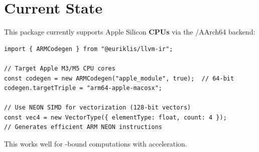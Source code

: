 \section{Current State}

This package currently supports Apple Silicon \textbf{CPUs} via the /AArch64 backend:

\begin{lstlisting}[style=ts]
import { ARMCodegen } from "@euriklis/llvm-ir";

// Target Apple M3/M5 CPU cores
const codegen = new ARMCodegen("apple_module", true);  // 64-bit
codegen.targetTriple = "arm64-apple-macosx";

// Use NEON SIMD for vectorization (128-bit vectors)
const vec4 = new VectorType({ elementType: float, count: 4 });
// Generates efficient ARM NEON instructions
\end{lstlisting}

This works well for -bound computations with  acceleration.

